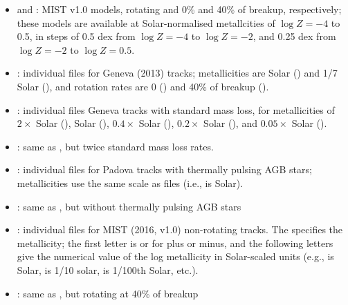 \documentclass[letterpaper,10pt,english]{sphinxmanual}
\begin{document}
\begin{itemize}
\begin{description}
\begin{itemize}
\item {} 
 and : MIST v1.0 models, rotating and 0\% and 40\% of breakup, respectively; these models are available at Solar-normalised metallcities of \(\log Z = -4\) to 0.5, in steps of 0.5 dex from \(\log Z = -4\) to \(\log Z = -2\), and 0.25 dex from \(\log Z = -2\) to \(\log Z = 0.5\).

\item {} 
: individual files for Geneva (2013) tracks; metallicities are Solar () and 1/7 Solar (), and rotation rates are 0 () and 40\% of breakup ().

\item {} 
: individual files Geneva tracks with standard mass loss, for metallicities of \(2\times\) Solar (), Solar (), \(0.4\times\) Solar (), \(0.2\times\) Solar (), and \(0.05\times\) Solar ().

\item {} 
: same as , but twice standard mass loss rates.

\item {} 
: individual files for Padova tracks with thermally pulsing AGB stars; metallicities use the same scale as  files (i.e.,  is Solar).

\item {} 
: same as , but without thermally pulsing AGB stars

\item {} 
: individual files for MIST (2016, v1.0) non-rotating tracks. The  specifies the metallicity; the first letter is  or  for plus or minus, and the following letters give the numerical value of the log metallicity in Solar-scaled units (e.g.,  is Solar,  is 1/10 solar,  is 1/100th Solar, etc.).

\item {} 
: same as , but rotating at 40\% of breakup


\end{itemize}
\end{description}
\end{itemize}
\end{document}
